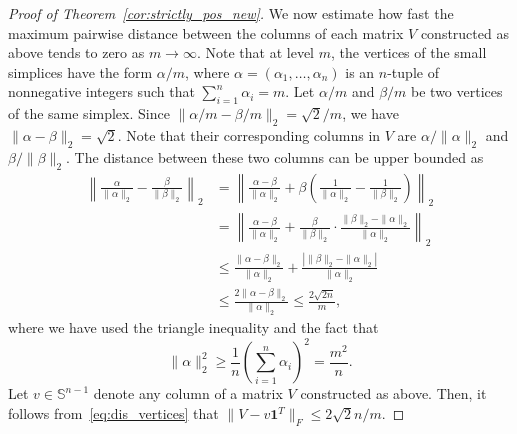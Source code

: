 \documentclass[12pt]{article}
\newcommand{\reals}{\mathbb{R}}
\newcommand{\mbS}{\mathbb{S}}
\theoremstyle{remark}
\begin{document}
\begin{proof}[Proof of Theorem~\ref{cor:strictly_pos_new}]
We now estimate how fast the maximum pairwise distance between the columns of each matrix $V$ constructed as above tends to zero as $m\to\infty$. Note that at level $m$, the vertices of the small simplices have the form $\alpha/m$, where $\alpha=(\alpha_1,\ldots,\alpha_n)$ is an $n$-tuple of nonnegative integers such that $\sum_{i=1}^n\alpha_i=m$. Let $\alpha/m$ and $\beta/m$ be two vertices of the same simplex. Since $\|\alpha/m-\beta/m\|_2=\sqrt{2}/m$, we have $\|\alpha-\beta\|_2=\sqrt{2}$. Note that their corresponding columns in $V$ are $\alpha/\|\alpha\|_2$ and $\beta/\|\beta\|_2$. The distance between these two columns can be upper bounded as
\begin{equation}\label{eq:dis_vertices}
   \begin{aligned}
\left\|\frac{\alpha
}{\|\alpha\|_2}-\frac{\beta
}{\|\beta\|_2}\right\|_2&=\left\|\frac{\alpha-\beta}{\|\alpha\|_2}+\beta\left(\frac{1
}{\|\alpha\|_2}-\frac{1
}{\|\beta\|_2}\right)\right\|_2\\
&=\left\|\frac{\alpha-\beta}{\|\alpha\|_2}+\frac{\beta}{\|\beta\|_2}\cdot\frac{\|\beta\|_2-\|\alpha\|_2
}{\|\alpha\|_2}\right\|_2\\
&\le \frac{\|\alpha-\beta\|_2}{\|\alpha\|_2}+\frac{|\|\beta\|_2-\|\alpha\|_2|}{\|\alpha\|_2}\\
&\le \frac{2\|\alpha-\beta\|_2}{\|\alpha\|_2}\le \frac{2\sqrt{2n}}{m},
\end{aligned} 
\end{equation}
where we have used the triangle inequality and the fact that 
\[\|\alpha\|_2^2\ge \frac{1}{n}\left(\sum_{i=1}^n\alpha_i\right)^2=\frac{m^2}{n}.\] 
Let $v\in\mbS^{n-1}$ denote any column of a matrix $V$ constructed as above. Then, it follows from~\eqref{eq:dis_vertices} that $\|V-v\mathbf{1}^T\|_F\le 2\sqrt{2}n/m$. 

\end{proof}
\end{document}
